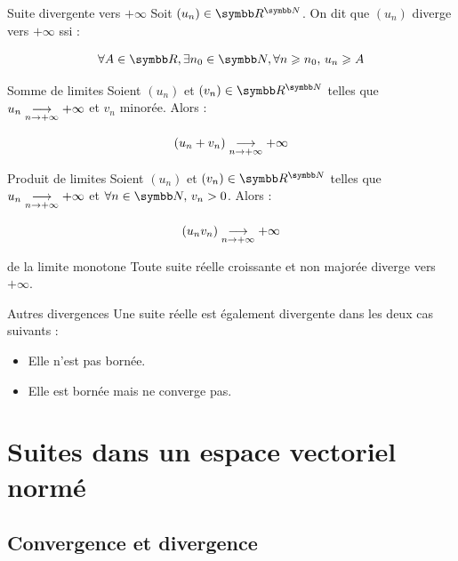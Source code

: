 \begin{definition}{Suite divergente vers $+\infty$}{}
    Soit $(u_n) \in \R^{\N}$. On dit que $(u_n)$ diverge vers $+\infty$ ssi : 

    \[\forall A \in \R, \exists n_0 \in \N, \forall n \geqslant n_0, \, u_n \geqslant A\]
\end{definition}

\begin{theoreme}{Somme de limites}{}
    Soient $(u_n)$ et $(v_n) \in \R^{\N}$ telles que 
    $u_n \underset{n \to +\infty}{\longrightarrow} +\infty$ et $v_n$ minorée. Alors :

    \[(u_n + v_n) \underset{n \to +\infty}{\longrightarrow} +\infty\]
\end{theoreme}

\begin{theoreme}{Produit de limites}{}
    Soient $(u_n)$ et $(v_n) \in \R^{\N}$ telles que
    $u_n \underset{n \to +\infty}{\longrightarrow} +\infty$ et $\forall n \in \N, \, v_n > 0$. Alors :

    \[(u_n v_n) \underset{n \to +\infty}{\longrightarrow} +\infty\]
\end{theoreme}

\begin{theoreme}{de la limite monotone}{}
    Toute suite réelle croissante et non majorée diverge vers $+\infty$.
\end{theoreme}

\begin{definition}{Autres divergences}{}
    Une suite réelle est également divergente dans les deux cas suivants : 
    \begin{itemize}
        \item Elle n'est pas bornée. 
        \item Elle est bornée mais ne converge pas.
    \end{itemize}
\end{definition}

\section{Suites dans un espace vectoriel normé}
\subsection{Convergence et divergence}

